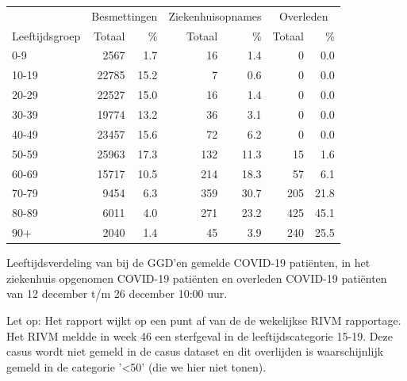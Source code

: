 \documentclass[
  english,
  man,floatsintext]{apa6}
\begin{document}
\begin{table}[H]
\centering\begingroup\fontsize{11}{13}\selectfont

\begin{threeparttable}
\begin{tabular}{lrrrrrr}
\toprule
\multicolumn{1}{c}{ } & \multicolumn{2}{c}{Besmettingen} & \multicolumn{2}{c}{Ziekenhuisopnames} & \multicolumn{2}{c}{Overleden} \\
\cmidrule(l{3pt}r{3pt}){2-3} \cmidrule(l{3pt}r{3pt}){4-5} \cmidrule(l{3pt}r{3pt}){6-7}
Leeftijdsgroep & Totaal & \% & Totaal & \% & Totaal & \%\\
\midrule
0-9 & 2567 & 1.7 & 16 & 1.4 & 0 & 0.0\\
10-19 & 22785 & 15.2 & 7 & 0.6 & 0 & 0.0\\
20-29 & 22527 & 15.0 & 16 & 1.4 & 0 & 0.0\\
30-39 & 19774 & 13.2 & 36 & 3.1 & 0 & 0.0\\
40-49 & 23457 & 15.6 & 72 & 6.2 & 0 & 0.0\\
50-59 & 25963 & 17.3 & 132 & 11.3 & 15 & 1.6\\
60-69 & 15717 & 10.5 & 214 & 18.3 & 57 & 6.1\\
70-79 & 9454 & 6.3 & 359 & 30.7 & 205 & 21.8\\
80-89 & 6011 & 4.0 & 271 & 23.2 & 425 & 45.1\\
90+ & 2040 & 1.4 & 45 & 3.9 & 240 & 25.5\\
\bottomrule
\end{tabular}
\begin{tablenotes}
\item[1] Leeftijdsverdeling van bij de GGD’en gemelde COVID-19 patiënten, in het ziekenhuis opgenomen COVID-19 patiënten en overleden COVID-19 patiënten van 12 december t/m 26 december 10:00 uur.
\item[2] Let op: Het rapport wijkt op een punt af van de de wekelijkse RIVM rapportage. Het RIVM meldde in week 46 een sterfgeval in de leeftijdscategorie 15-19. Deze casus wordt niet gemeld in de casus dataset en dit overlijden is waarschijnlijk gemeld in de categorie '<50' (die we hier niet tonen).
\end{tablenotes}
\end{threeparttable}
\endgroup{}
\end{table}

\newpage
\end{document}
